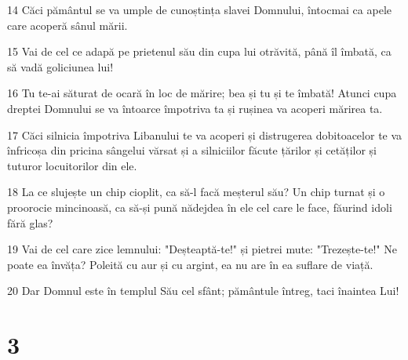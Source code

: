 \par 14 Căci pământul se va umple de cunoștința slavei Domnului, întocmai ca apele care acoperă sânul mării.
\par 15 Vai de cel ce adapă pe prietenul său din cupa lui otrăvită, până îl îmbată, ca să vadă goliciunea lui!
\par 16 Tu te-ai săturat de ocară în loc de mărire; bea și tu și te îmbată! Atunci cupa dreptei Domnului se va întoarce împotriva ta și rușinea va acoperi mărirea ta.
\par 17 Căci silnicia împotriva Libanului te va acoperi și distrugerea dobitoacelor te va înfricoșa din pricina sângelui vărsat și a silniciilor făcute țărilor și cetăților și tuturor locuitorilor din ele.
\par 18 La ce slujește un chip cioplit, ca să-l facă meșterul său? Un chip turnat și o proorocie mincinoasă, ca să-și pună nădejdea în ele cel care le face, făurind idoli fără glas?
\par 19 Vai de cel care zice lemnului: "Deșteaptă-te!" și pietrei mute: "Trezește-te!" Ne poate ea învăța? Poleită cu aur și cu argint, ea nu are în ea suflare de viață.
\par 20 Dar Domnul este în templul Său cel sfânt; pământule întreg, taci înaintea Lui!

\chapter{3}

